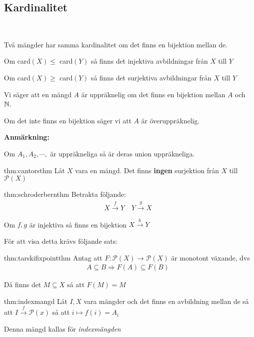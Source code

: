 \subsection{Kardinalitet}\hfill\\\par
\noindent Två mängder har samma kardinalitet om det finns en bijektion mellan de.
\par\bigskip
\noindent Om card$(X)\leq$ card$(Y)$ så finns det injektiva avbildningar från $X$ till $Y$\par
\noindent Om card$(X)\geq$ card$(Y)$ så finns det surjektiva avbildningar från $X$ till $Y$
\par\bigskip
\noindent Vi säger att en mängd $A$ är uppräknelig om det finns en bijektion mellan $A$ och $\mathbb{N}$.\par
Om det inte finns en bijektion säger vi att $A$ är överuppräknelig.
\par\bigskip
\noindent\textbf{Anmärkning:}\par
\noindent Om $A_1,A_2,\cdots,$ är uppräkneliga så är deras union uppräkneliga.
\par\bigskip
\begin{theo}{thm:cantorsthm}
  Låt $X$ vara en mängd. Det finns \textbf{ingen} surjektion från $X$ till $\mathcal{P}(X)$ 
\end{theo}
\par\bigskip
\begin{theo}{thm:schroderbernthm}
  Betrakta följande:
  \begin{equation*}
    \begin{gathered}
      X\stackrel{f}{\to}Y\quad Y\stackrel{g}{\to}X
    \end{gathered}
  \end{equation*}\par
  \noindent Om $f,g$ är injektiva så finns en bijektion $X\stackrel{h}{\to}Y$
\end{theo}
\par\bigskip
\noindent För att visa detta krävs följande sats:
\par\bigskip
\begin{theo}{thm:tarskifixpointthm}
  Antag att $F:\mathcal{P}(X)\to\mathcal{P}(X)$ är monotont växande, dvs
  \begin{equation*}
    \begin{gathered}
      A\subseteq B\Rightarrow F(A)\subseteq F(B)
    \end{gathered}
  \end{equation*}\par
  \noindent Då finns det $M\subseteq X$ så att $F(M) = M$
\end{theo}
\newpage
\begin{theo}{thm:indexmangd}
  Låt $I,X$ vara mängder och det finns en avbildning mellan de så att $I\stackrel{f}{\to}\mathcal{P}(x)$ så att $i\mapsto f(i)=A_i$\par
  \noindent Denna mängd kallas för \textit{indexmängden}
  \par\bigskip
\end{theo}

